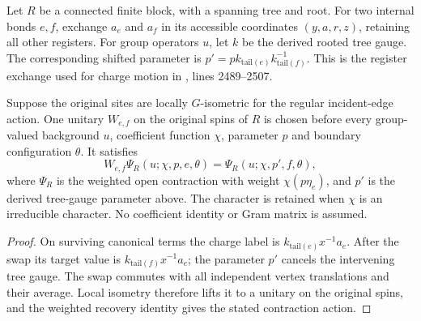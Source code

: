 \begin{definition}
    \label{def:peps_regular_charge_move_coordinates}
    \leanok
    Let $R$ be a connected finite block, with a spanning tree and root.
    For two internal bonds $e,f$, exchange $a_e$ and $a_f$ in its
    accessible coordinates $(y,a,r,z)$, retaining all other registers.
    For group operators $u$, let $k$ be the derived rooted tree gauge.
    The corresponding shifted parameter is
    $p'=p k_{\mathrm{tail}(e)}k_{\mathrm{tail}(f)}^{-1}$.
    This is the register exchange used for charge motion in
    \cite{Schuch2010PEPS}, lines 2489--2507.
\end{definition}

\begin{lemma}
    \label{thm:peps_regular_physical_charge_motion}
    \leanok
    Suppose the original sites are locally $G$-isometric for the regular
    incident-edge action. One unitary $W_{e,f}$ on the original spins of $R$
    is chosen before every group-valued background $u$, coefficient
    function $\chi$, parameter $p$ and boundary configuration $\theta$.
    It satisfies
    \[
        W_{e,f}\Psi_R(u;\chi,p,e,\theta)
        =\Psi_R(u;\chi,p',f,\theta),
    \]
    where $\Psi_R$ is the weighted open contraction with weight
    $\chi(p\eta_e)$, and $p'$ is the derived tree-gauge parameter above.
    The character is retained when $\chi$ is an irreducible character.
    No coefficient identity or Gram matrix is assumed.
\end{lemma}
\begin{proof}\leanok
    On surviving canonical terms the charge label is
    $k_{\mathrm{tail}(e)}x^{-1}a_e$. After the swap its target value is
    $k_{\mathrm{tail}(f)}x^{-1}a_e$; the parameter $p'$ cancels the
    intervening tree gauge. The swap commutes with all independent vertex
    translations and their average. Local isometry therefore lifts it to
    a unitary on the original spins, and the weighted recovery
    identity gives the stated contraction action.
\end{proof}


